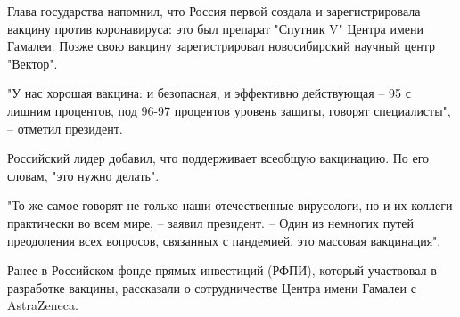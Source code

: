 Глава государства напомнил, что Россия первой создала и зарегистрировала
вакцину против коронавируса: это был препарат "Спутник V" Центра имени Гамалеи.
Позже свою вакцину зарегистрировал новосибирский научный центр "Вектор".

"У нас хорошая вакцина: и безопасная, и эффективно действующая – 95 с лишним
процентов, под 96-97 процентов уровень защиты, говорят специалисты", – отметил
президент.

Российский лидер добавил, что поддерживает всеобщую вакцинацию. По его словам,
"это нужно делать".

"То же самое говорят не только наши отечественные вирусологи, но и их коллеги
практически во всем мире, – заявил президент. – Один из немногих путей
преодоления всех вопросов, связанных с пандемией, это массовая вакцинация".

Ранее в Российском фонде прямых инвестиций (РФПИ), который участвовал в
разработке вакцины, рассказали о сотрудничестве Центра имени Гамалеи с
AstraZeneca.

